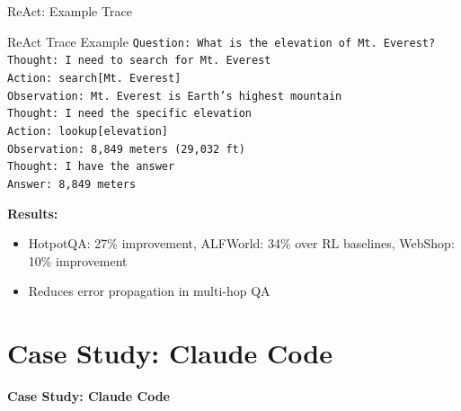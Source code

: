 \documentclass[aspectratio=169]{beamer}
\begin{document}
\begin{frame}{ReAct: Example Trace}
		\begin{block}{ReAct Trace Example}
			\footnotesize
			\texttt{Question: What is the elevation of Mt. Everest?}\\
			\texttt{Thought: I need to search for Mt. Everest}\\
			\texttt{Action: search[Mt. Everest]}\\
			\texttt{Observation: Mt. Everest is Earth's highest mountain}\\
			\texttt{Thought: I need the specific elevation}\\
			\texttt{Action: lookup[elevation]}\\
			\texttt{Observation: 8,849 meters (29,032 ft)}\\
			\texttt{Thought: I have the answer}\\
			\texttt{Answer: 8,849 meters}
		\end{block}
		
		\textbf{Results:}
		\begin{itemize}
			\item HotpotQA: {\color{highlight}27\% improvement}, ALFWorld: {\color{highlight}34\% over RL baselines},
			WebShop: {\color{highlight}10\% improvement}
			\item Reduces error propagation in multi-hop QA
		\end{itemize}
\end{frame}



\section{Case Study: Claude Code}

\begin{frame}
	\begin{center}
		\Large
		\textbf{Case Study: Claude Code}
	\end{center}
\end{frame}
\end{document}
